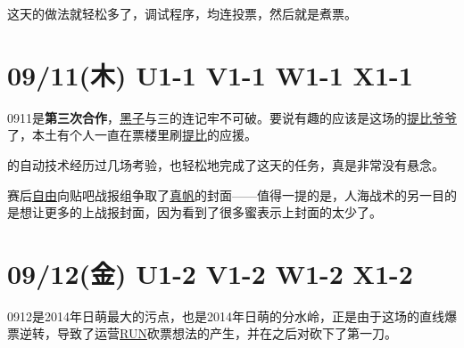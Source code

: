这天的做法就轻松多了，调试程序，均连投票，然后就是煮票。

\section{09/11(木) U1-1 V1-1 W1-1 X1-1}


0911是\textbf{第三次合作}，\uline{黑子}与三的连记牢不可破。要说有趣的应该是这场的\uline{提比爷爷}了，本土有个人一直在票楼里刷\uline{提比}的应援。

的自动技术经历过几场考验，也轻松地完成了这天的任务，真是非常没有悬念。

赛后\uline{自由}向贴吧战报组争取了\uline{真帆}的封面——值得一提的是，人海战术的另一目的是想让更多的上战报封面，因为看到了很多蜜表示上封面的太少了。

\section{09/12(金) U1-2 V1-2 W1-2 X1-2}

0912是2014年日萌最大的污点，也是2014年日萌的分水岭，正是由于这场的直线爆票逆转，导致了运营\uline{RUN}砍票想法的产生，并在之后对砍下了第一刀。

